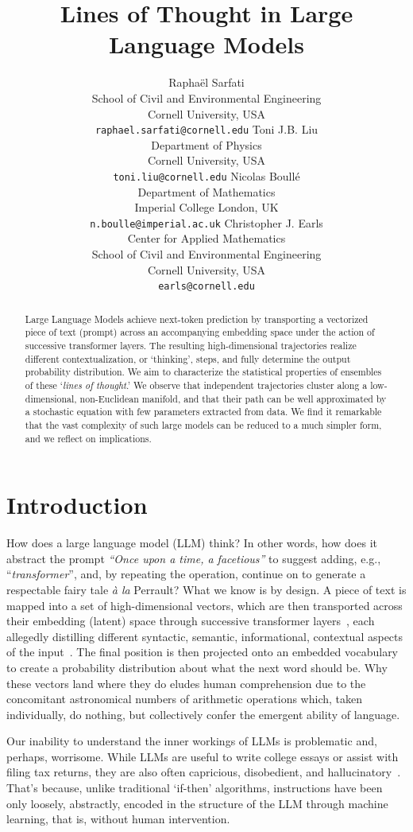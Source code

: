 \documentclass{article} %
\title{Lines of Thought in Large Language Models}
\author{Rapha\"el Sarfati\\
School of Civil and Environmental Engineering\\
Cornell University, USA\\
\texttt{raphael.sarfati@cornell.edu}
\And
Toni J.B. Liu\\
Department of Physics\\
Cornell University, USA\\
\texttt{toni.liu@cornell.edu}
\And
Nicolas Boull\'e\\
Department of Mathematics\\
Imperial College London, UK\\
\texttt{n.boulle@imperial.ac.uk}
\And
Christopher J. Earls \\
Center for Applied Mathematics \\
School of Civil and Environmental Engineering\\
Cornell University, USA\\
\texttt{earls@cornell.edu}
}
\newcommand{\nb}[1]{{\color{teal} NB: #1}} %
\begin{document}
\maketitle

\begin{abstract}
Large Language Models achieve next-token prediction by transporting a vectorized piece of text (prompt) across an accompanying embedding space under the action of successive transformer layers.
The resulting high-dimensional trajectories realize different contextualization, or `thinking', steps, and fully determine the output probability distribution. We aim to characterize the statistical properties of ensembles of these `\emph{lines of thought}.' We observe that independent trajectories cluster along a low-dimensional, non-Euclidean manifold, and that their path can be well approximated by a stochastic equation with few parameters extracted from data.
We find it remarkable that the vast complexity of such large models can be reduced to a much simpler form, and we reflect on implications.
\end{abstract}



\section{Introduction}
\label{sec:intro}

How does a large language model (LLM) think?
In other words, how does it abstract the prompt \textit{``Once upon a time, a facetious''} to suggest adding, e.g., ``\textit{transformer}'', and, by repeating the operation, continue on to generate a respectable fairy tale \textit{\`{a} la} Perrault?
What we know is by design.
A piece of text is mapped into a set of high-dimensional vectors, which are then transported across their embedding (latent) space through successive transformer layers~\citep{vaswani2023attentionneed}, each allegedly distilling different syntactic, semantic, informational, contextual aspects of the input~\citep{valeriani2023geometryhiddenrepresentationslarge,song2024uncoveringhiddengeometrytransformers}.
The final position is then projected onto an embedded vocabulary to create a probability distribution about what the next word should be.
Why these vectors land where they do eludes human comprehension due to the concomitant astronomical numbers of arithmetic operations which, taken individually, do nothing, but collectively confer the emergent ability of language. 

Our inability to understand the inner workings of LLMs is problematic and, perhaps, worrisome.
While LLMs are useful to write college essays or assist with filing tax returns, they are also often capricious, disobedient, and hallucinatory~\citep{sharma2023understandingsycophancylanguagemodels,zhang2023sirenssongaiocean}. 
That's because, unlike traditional `if-then' algorithms, instructions have been only loosely, abstractly, encoded in the structure of the LLM through machine learning, that is, without human intervention.
\end{document}
